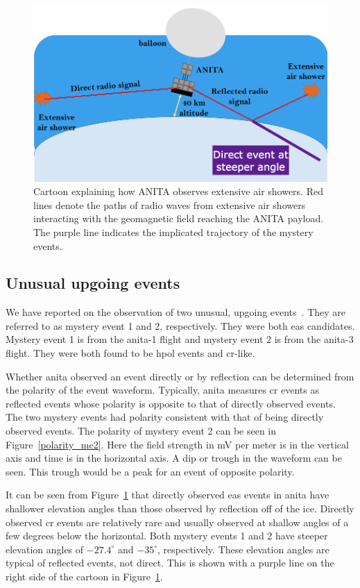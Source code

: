 \begin{figure}
\centering
\includegraphics[width=1.0\textwidth]{figures/anita_cartoon_me.png}
\caption{Cartoon explaining how ANITA observes extensive air showers. Red lines denote the paths of radio waves from extensive air showers interacting with the geomagnetic field reaching the ANITA payload. The purple line indicates the implicated trajectory of the mystery events.}
\label{eas_cartoon}
\end{figure}

\subsection{Unusual upgoing events}

We have reported on the observation of two unusual, upgoing events~\cite{me1,me2}. They are referred to as mystery event 1 and 2, respectively. They were both \gls{eas} candidates. Mystery event 1 is from the \gls{anita}-1 flight and mystery event 2 is from the \gls{anita}-3 flight. They were both found to be \gls{hpol} events and \gls{cr}-like. 

Whether \gls{anita} observed an event directly or by reflection can be determined from the polarity of the event waveform. 
Typically, \gls{anita} measures \gls{cr} events as reflected events whose polarity is opposite to that of directly observed events.  The two mystery events had polarity consistent with that of being directly observed events. The polarity of mystery event 2 can be seen in Figure~\ref{polarity_me2}. Here the field strength in mV per meter is in the vertical axis and time is in the horizontal axis. A dip or trough in the waveform can be seen. This trough would be a peak for an event of opposite polarity. 

It can be seen from Figure~\ref{eas_cartoon} that directly observed \gls{eas} events in \gls{anita} have shallower elevation angles than those observed by reflection off of the ice. Directly observed \gls{cr} events are relatively rare and usually observed at shallow angles of a few degrees below the horizontal. Both mystery events 1 and 2 have steeper elevation angles of $-27.4^{\circ}$ and $-35^{\circ}$, respectively. These elevation angles are typical of reflected events, not direct. This is shown with a purple line on the right side of the cartoon in Figure~\ref{eas_cartoon}. 

